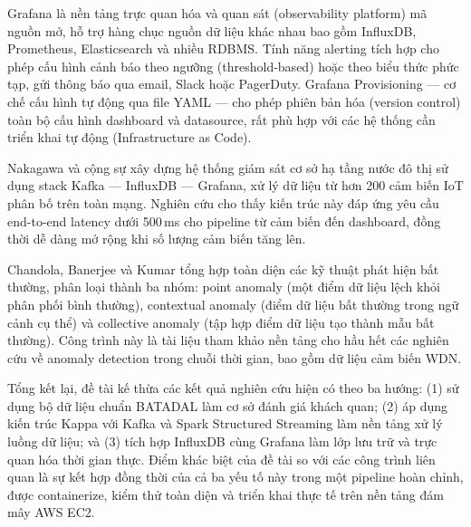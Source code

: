 Grafana \cite{grafana2024grafana} là nền tảng trực quan hóa và quan sát
(observability platform) mã nguồn mở, hỗ trợ hàng chục nguồn dữ liệu khác nhau bao
gồm InfluxDB, Prometheus, Elasticsearch và nhiều RDBMS. Tính năng alerting tích hợp
cho phép cấu hình cảnh báo theo ngưỡng (threshold-based) hoặc theo biểu thức phức
tạp, gửi thông báo qua email, Slack hoặc PagerDuty. Grafana Provisioning --- cơ chế
cấu hình tự động qua file YAML --- cho phép phiên bản hóa (version control) toàn
bộ cấu hình dashboard và datasource, rất phù hợp với các hệ thống cần triển khai
tự động (Infrastructure as Code).

Nakagawa và cộng sự \cite{nakagawa2020realtime} xây dựng hệ thống giám sát
cơ sở hạ tầng nước đô thị sử dụng stack Kafka --- InfluxDB --- Grafana, xử lý dữ
liệu từ hơn 200 cảm biến IoT phân bố trên toàn mạng. Nghiên cứu cho thấy kiến
trúc này đáp ứng yêu cầu end-to-end latency dưới 500\,ms cho pipeline từ cảm biến
đến dashboard, đồng thời dễ dàng mở rộng khi số lượng cảm biến tăng lên.

Chandola, Banerjee và Kumar \cite{chandola2009anomaly} tổng hợp toàn diện các kỹ
thuật phát hiện bất thường, phân loại thành ba nhóm: point anomaly (một điểm dữ
liệu lệch khỏi phân phối bình thường), contextual anomaly (điểm dữ liệu bất thường
trong ngữ cảnh cụ thể) và collective anomaly (tập hợp điểm dữ liệu tạo thành mẫu
bất thường). Công trình này là tài liệu tham khảo nền tảng cho hầu hết các nghiên
cứu về anomaly detection trong chuỗi thời gian, bao gồm dữ liệu cảm biến WDN.

Tổng kết lại, đề tài kế thừa các kết quả nghiên cứu hiện có theo ba hướng: (1)
sử dụng bộ dữ liệu chuẩn BATADAL \cite{taormina2018batadal} làm cơ sở đánh giá
khách quan; (2) áp dụng kiến trúc Kappa \cite{kreps2014kappa} với Kafka
\cite{kreps2011kafka} và Spark Structured Streaming \cite{zaharia2016spark} làm
nền tảng xử lý luồng dữ liệu; và (3) tích hợp InfluxDB cùng Grafana làm lớp lưu
trữ và trực quan hóa thời gian thực. Điểm khác biệt của đề tài so với các công
trình liên quan là sự kết hợp đồng thời của cả ba yếu tố này trong một pipeline
hoàn chỉnh, được containerize, kiểm thử toàn diện và triển khai thực tế trên nền
tảng đám mây AWS EC2.
